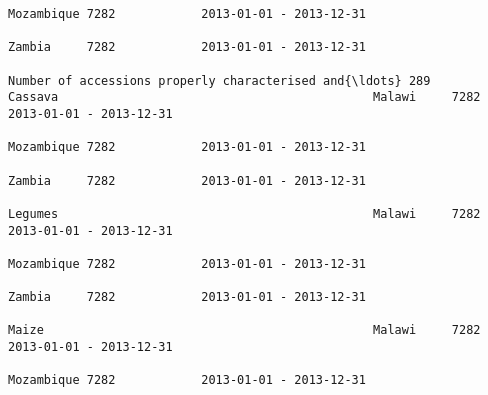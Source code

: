 \documentclass[11pt]{article}
\begin{document}
\begin{Verbatim}[commandchars=\\\{\}]
                                                                                                                                                                                                                 Mozambique 7282            2013-01-01 - 2013-12-31   
                                                                                                                                                                                                                 Zambia     7282            2013-01-01 - 2013-12-31   
                                                                         Number of accessions properly characterised and{\ldots} 289                               Cassava                                            Malawi     7282            2013-01-01 - 2013-12-31   
                                                                                                                                                                                                                 Mozambique 7282            2013-01-01 - 2013-12-31   
                                                                                                                                                                                                                 Zambia     7282            2013-01-01 - 2013-12-31   
                                                                                                                                                              Legumes                                            Malawi     7282            2013-01-01 - 2013-12-31   
                                                                                                                                                                                                                 Mozambique 7282            2013-01-01 - 2013-12-31   
                                                                                                                                                                                                                 Zambia     7282            2013-01-01 - 2013-12-31   
                                                                                                                                                              Maize                                              Malawi     7282            2013-01-01 - 2013-12-31   
                                                                                                                                                                                                                 Mozambique 7282            2013-01-01 - 2013-12-31   

\end{Verbatim}
\end{document}
